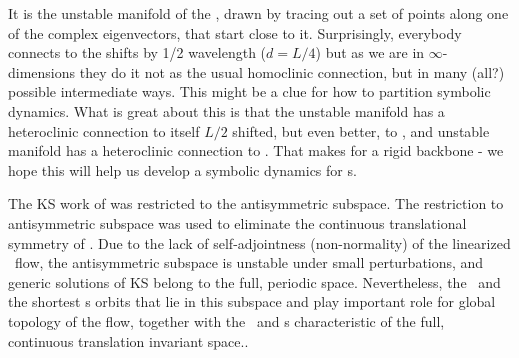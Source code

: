 
 It is the unstable manifold of the 
{\eqv}, drawn by tracing out a set of points along one of the complex
eigenvectors, that start close to it. Surprisingly, everybody connects
to the  shifts by 1/2 wavelength ($d = L/4$) but as we are in
$\infty$-dimensions they do it not as the usual homoclinic connection, but in
many (all?) possible intermediate ways. This might be a clue for how to
partition symbolic dynamics.
What is great about
this is that the  unstable manifold has a heteroclinic connection to itself
$L/2$ shifted, but
even better, to , and  unstable manifold has a heteroclinic
connection to .
That makes for a rigid backbone -
we hope this will help us develop a symbolic dynamics for \rpo s.

The KS work
of 
was restricted to the antisymmetric subspace.
The restriction to antisymmetric subspace was used
to eliminate the continuous translational symmetry of \KSe.
Due to the lack of self-adjointness
(non-normality) of the linearized \KS\ flow,
the antisymmetric subspace
is unstable under small perturbations, and generic solutions of
KS belong to the full, periodic space.
Nevertheless,
the \eqva\ and the shortest \po s orbits that lie in this subspace
and play important role for global topology of the flow,
together
with the \reqva\ and \rpo s
characteristic of the full, continuous translation invariant space..

